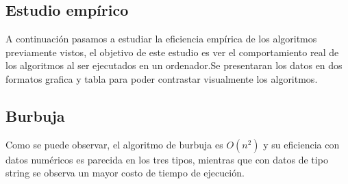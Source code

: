 \documentclass[11pt]{article}
\begin{document}
\subsection{Estudio empírico}
A continuación pasamos a estudiar la eficiencia empírica de los algoritmos previamente vistos, el objetivo de este estudio es ver el comportamiento real 
de los algoritmos al ser ejecutados en un ordenador.Se presentaran los datos en dos formatos grafica y tabla para poder contrastar visualmente los algoritmos.

\subsection*{Burbuja}
Como se puede observar, el algoritmo de burbuja es \(O(n^2)\) y su eficiencia con datos numéricos es parecida en los tres
tipos, mientras que con datos de tipo string se observa un mayor costo de tiempo de ejecución.
\end{document}
